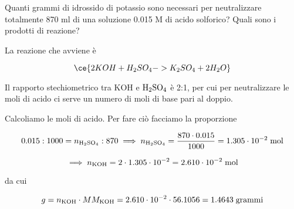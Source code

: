 \newpage

\begin{esercizio}
    Quanti grammi di idrossido di potassio sono necessari per neutralizzare totalmente 870 ml di una soluzione 0.015 M di acido solforico? Quali sono i prodotti di reazione?
\end{esercizio}
\begin{soluzione}
    La reazione che avviene è

$$\ce{2KOH + H_2SO_4 -> K_2SO_4 + 2H_2O}$$

Il rapporto stechiometrico tra KOH e $\rm H_2SO_4$ è 2:1, per cui per neutralizzare le moli di acido ci serve un numero di moli di base pari al doppio.

Calcoliamo le moli di acido. Per fare ciò facciamo la proporzione

$$0.015:1000=n_{\rm H_2SO_4}:870
\implies
n_{\rm H_2SO_4}=\frac{870 \cdot 0.015}{1000}=1.305 \cdot 10^{-2} \; \rm mol$$

$$\implies n_{\rm KOH}=2 \cdot 1.305 \cdot 10^{-2}=2.610 \cdot 10^{-2} \; \rm mol$$

da cui

$$g=n_{\rm KOH} \cdot MM_{\rm KOH}
=2.610 \cdot 10^{-2} \cdot 56.1056
=1.4643 \; \rm grammi$$

\end{soluzione}

\newpage

